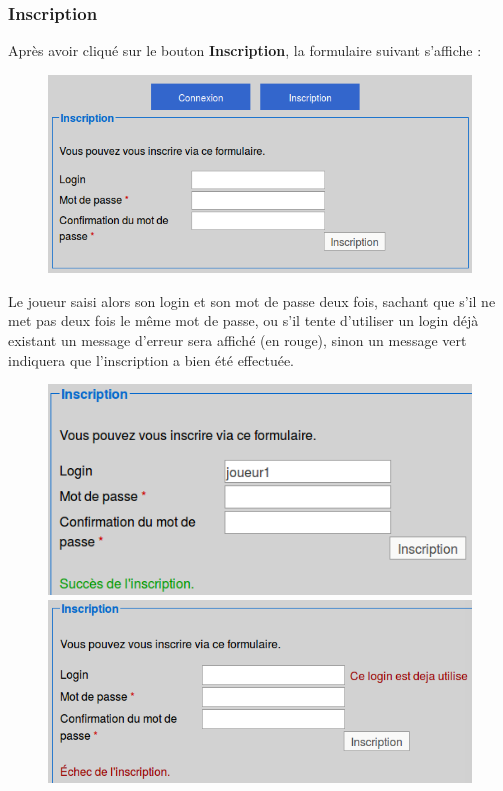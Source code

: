     \subsubsection{Inscription}
    Après avoir cliqué sur le bouton \textbf{Inscription}, la formulaire suivant s'affiche :
    \begin{figure}[H]
      \center 
      \includegraphics[scale=0.5]{../graph/2-inscription.png} 
    \end{figure}    
    Le joueur saisi alors son login et son mot de passe deux fois, sachant que s'il ne met pas deux fois le même mot de passe, ou s'il tente d'utiliser un login déjà existant un message d'erreur sera affiché (en rouge), sinon un message vert indiquera que l'inscription a bien été effectuée.
    \begin{figure}[H]
      \center 
      \includegraphics[scale=0.36]{../graph/2.1-inscriptionsucces.png} 
      \includegraphics[scale=0.36]{../graph/2.2-inscriptionechec.png} 
    \end{figure}

